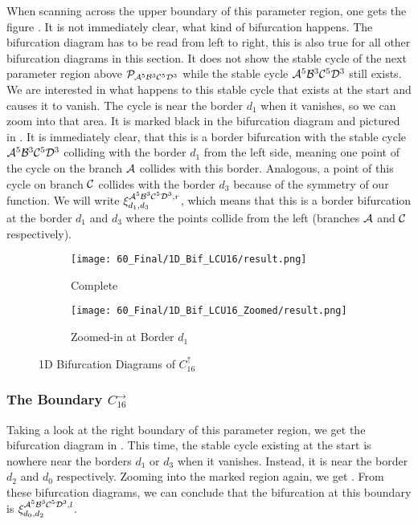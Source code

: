 When scanning across the upper boundary of this parameter region, one gets the figure .
It is not immediately clear, what kind of bifurcation happens.
The bifurcation diagram has to be read from left to right, this is also true for all other bifurcation diagrams in this section.
It does not show the stable cycle of the next parameter region above $\mathcal{P}_{\mathcal{A}^5\mathcal{B}^3\mathcal{C}^5\mathcal{D}^3}$ while the stable cycle $\mathcal{A}^5\mathcal{B}^3\mathcal{C}^5\mathcal{D}^3$ still exists.
We are interested in what happens to this stable cycle that exists at the start and causes it to vanish.
The cycle is near the border $d_1$ when it vanishes, so we can zoom into that area.
It is marked black in the bifurcation diagram and pictured in .
It is immediately clear, that this is a border bifurcation with the stable cycle $\mathcal{A}^5\mathcal{B}^3\mathcal{C}^5\mathcal{D}^3$ colliding with the border $d_1$ from the left side, meaning one point of the cycle on the branch $\mathcal{A}$ collides with this border.
Analogous, a point of this cycle on branch $\mathcal{C}$ collides with the border $d_3$ because of the symmetry of our function.
We will write $\xi_{d_1, d_3}^{\mathcal{A}^5\mathcal{B}^3\mathcal{C}^5\mathcal{D}^3, r}$, which means that this is a border bifurcation at the border $d_1$ and $d_3$ where the points collide from the left (branches $\mathcal{A}$ and $\mathcal{C}$ respectively).

\begin{figure}
    \centering
    \begin{subfigure}{0.4\textwidth}
        \centering
        \texttt{[image: 60\_Final/1D\_Bif\_LCU16/result.png]}
        \caption{Complete}
        \label{fig:final.bifurcation.C.up}
    \end{subfigure}
    \begin{subfigure}{0.4\textwidth}
        \centering
        \texttt{[image: 60\_Final/1D\_Bif\_LCU16\_Zoomed/result.png]}
        \caption{Zoomed-in at Border $d_1$}
        \label{fig:bifurcation.C.up.zoomed}
    \end{subfigure}
    \caption{1D Bifurcation Diagrams of $C_{16}^\uparrow$}
\end{figure}

\subsubsection{The Boundary $C_{16}^\rightarrow$}

Taking a look at the right boundary of this parameter region, we get the bifurcation diagram in .
This time, the stable cycle existing at the start is nowhere near the borders $d_1$ or $d_3$ when it vanishes.
Instead, it is near the border $d_2$ and $d_0$ respectively.
Zooming into the marked region again, we get .
From these bifurcation diagrams, we can conclude that the bifurcation at this boundary is $\xi_{d_0, d_2}^{\mathcal{A}^5\mathcal{B}^3\mathcal{C}^5\mathcal{D}^3, l}$.


